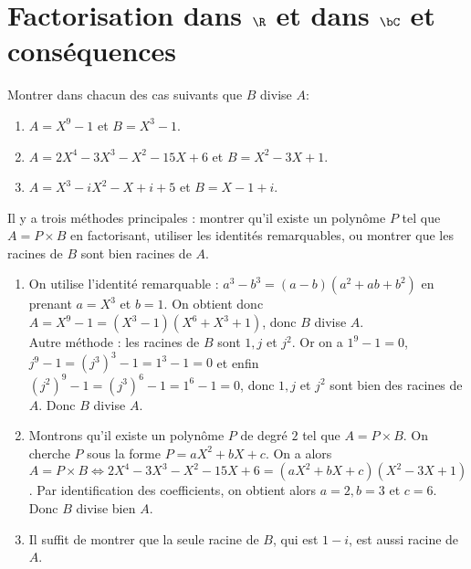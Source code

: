 \documentclass[a4paper, 11pt,reqno]{article}
\begin{document}
\section{\large{Factorisation dans $\R$ et dans $\bC$ et cons\'equences}}
\begin{exercice}  \;
	Montrer dans chacun des cas suivants que $B$ divise $A$:
	\begin{enumerate}
		\item $A=X^9-1$ et $B=X^3-1$.
		\item $A=2X^4-3X^3-X^2-15X+6$ et $B=X^2-3X+1$.
		\item $A=X^3-iX^2-X+i+5$ et $B=X-1+i$.
	\end{enumerate}
\end{exercice}
\begin{correction}  \;
	Il y a trois m\'ethodes principales : montrer qu'il existe un polyn\^ome $P$ tel que $A=P\times B$ en factorisant, utiliser les identit\'es remarquables, ou montrer que les racines de $B$ sont bien racines de $A$.
	\begin{enumerate}
		\item On utilise l'identit\'e remarquable : $a^3-b^3=(a-b)(a^2+ab+b^2)$ en prenant $a=X^3$ et $b=1$. On obtient donc $A= X^9-1=(X^3-1)(X^6+X^3+1)$, donc $B$ divise $A$.\\
		      Autre m\'ethode : les racines de $B$ sont $1, j$ et $j^2$. Or on a $1^9-1=0$, $j^9-1= (j^3)^3-1= 1^3-1=0$ et enfin $(j^2)^9-1=(j^3)^6-1=1^6-1=0$, donc  $1, j$ et $j^2$ sont bien des racines de $A$. Donc $B$ divise $A$.
		\item Montrons qu'il existe un polyn\^ome $P$ de degr\'e $2$ tel que $A=P\times B$. On cherche $P$ sous la forme $P=aX^2+bX+c$. On a alors $A=P\times B \Leftrightarrow 2X^4-3X^3-X^2-15X+6 = (aX^2+bX+c)(X^2-3X+1)$. Par identification des coefficients, on obtient alors $a=2,b=3$ et $c=6$. Donc $B$ divise bien $A$.
		\item Il suffit de montrer que la seule racine de $B$, qui est $1-i$, est aussi racine de $A$.
	\end{enumerate}
\end{correction}
\end{document}
